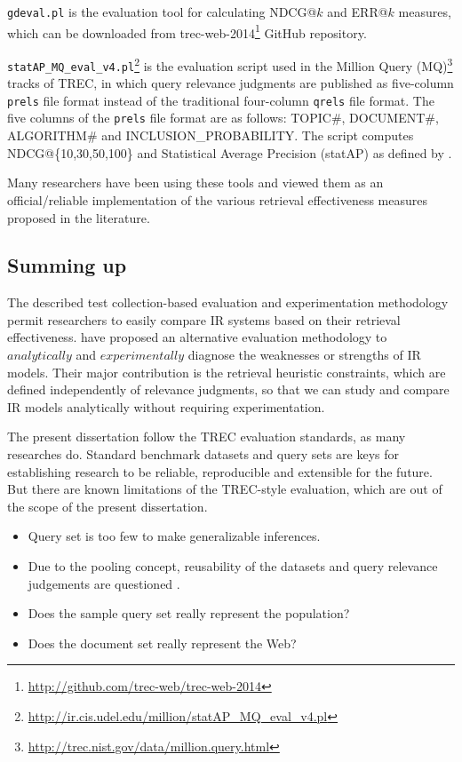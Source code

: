 \texttt{gdeval.pl} is the evaluation tool for calculating NDCG@$k$ and ERR@$k$ measures, which can be downloaded from trec-web-2014\footnote{\url{http://github.com/trec-web/trec-web-2014}} GitHub repository.

\texttt{statAP\_MQ\_eval\_v4.pl}\footnote{\url{http://ir.cis.udel.edu/million/statAP_MQ_eval_v4.pl}} is the evaluation script used in the Million Query (MQ)\footnote{\url{http://trec.nist.gov/data/million.query.html}} tracks of TREC, in which query relevance judgments are published as five-column \texttt{prels} file format instead of the traditional four-column \texttt{qrels} file format.
The five columns of the \texttt{prels} file format are as follows: TOPIC\#, DOCUMENT\#, ALGORITHM\# and INCLUSION\_PROBABILITY. 
The script computes NDCG@\{10,30,50,100\} and Statistical Average Precision (statAP) as defined by \citet*{statAP}.

Many researchers have been using these tools and viewed them as an official/reliable implementation of the various retrieval effectiveness measures proposed in the literature.

\subsection{Summing up}
The described test collection-based evaluation and experimentation methodology \citep{sanderson} permit researchers to easily compare IR systems based on their retrieval effectiveness. 
\citet{heuristics,fang} have proposed an alternative evaluation methodology to $analytically$ and $experimentally$ diagnose the weaknesses or strengths of IR models.
Their major contribution is the retrieval heuristic constraints, which are defined independently of relevance judgments, so that we can study and compare IR models analytically without requiring experimentation.

The present dissertation follow the TREC evaluation standards, as many researches do.
Standard benchmark datasets and query sets are keys for establishing research to be reliable, reproducible and extensible for the future. 
But there are known limitations of the TREC-style evaluation, which are out of the scope of the present dissertation.

\begin{itemize}
  \item Query set is too few to make generalizable inferences.
  \item Due to the pooling concept, reusability of the datasets and query relevance judgements are questioned \citep{biasPool}.
  \item Does the sample query set really represent the population?
  \item Does the document set really represent the Web?
\end{itemize}


